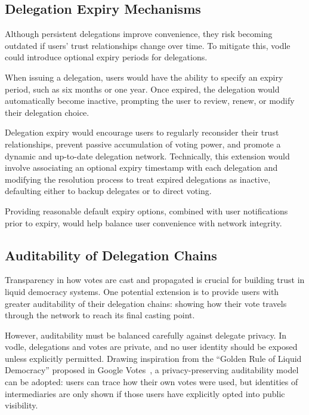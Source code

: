 \subsection{Delegation Expiry Mechanisms}

Although persistent delegations improve convenience, they risk becoming outdated if users' trust relationships change over time. To mitigate this, vodle could introduce optional expiry periods for delegations.

When issuing a delegation, users would have the ability to specify an expiry period, such as six months or one year. Once expired, the delegation would automatically become inactive, prompting the user to review, renew, or modify their delegation choice.

Delegation expiry would encourage users to regularly reconsider their trust relationships, prevent passive accumulation of voting power, and promote a dynamic and up-to-date delegation network. Technically, this extension would involve associating an optional expiry timestamp with each delegation and modifying the resolution process to treat expired delegations as inactive, defaulting either to backup delegates or to direct voting.

Providing reasonable default expiry options, combined with user notifications prior to expiry, would help balance user convenience with network integrity.

\subsection{Auditability of Delegation Chains}

Transparency in how votes are cast and propagated is crucial for building trust in liquid democracy systems. One potential extension is to provide users with greater auditability of their delegation chains: showing how their vote travels through the network to reach its final casting point.

However, auditability must be balanced carefully against delegate privacy. In vodle, delegations and votes are private, and no user identity should be exposed unless explicitly permitted. Drawing inspiration from the ``Golden Rule of Liquid Democracy'' proposed in Google Votes~\citep{hardt_google_2015}, a privacy-preserving auditability model can be adopted:  
users can trace how their own votes were used, but identities of intermediaries are only shown if those users have explicitly opted into public visibility.


